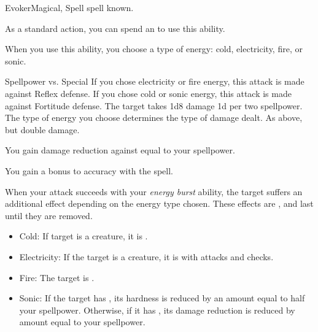     \begin{feat}{Evoker}{Magical, Spell}
        \featpre {} spell known.
        \featben

         As a standard action, you can spend an  to use this ability.
        \begin{ability}
            \begin{spelltargetinginfo}
                \spellspecial When you use this ability, you choose a type of energy: cold, electricity, fire, or sonic.
            \end{spelltargetinginfo}
            \begin{spelleffects}
                \begin{spellattack}{Spellpower vs. Special}
                    \spellspecial If you chose electricity or fire energy, this attack is made against Reflex defense. If you chose cold or sonic energy, this attack is made against Fortitude defense.
                    \spellsuccess The target takes 1d8 damage \plus1d per two spellpower.
                    The type of energy you choose determines the type of damage dealt.
                    \spellcritical As above, but double damage.
                \end{spellattack}
            \end{spelleffects}
        \end{ability}

         You gain damage reduction against  equal to your spellpower.

         You gain a  bonus to accuracy with the  spell.

         When your attack succeeds with your \textit{energy burst} ability, the target suffers an additional effect depending on the energy type chosen.
        These effects are , and last until they are removed.
        \begin{itemize}
            \item Cold: If target is a creature, it is \fatigued.
            \item Electricity: If the target is a creature, it is \impaired with attacks and checks.
            \item Fire: The target is \ignited.
            \item Sonic: If the target has , its hardness is reduced by an amount equal to half your spellpower. Otherwise, if it has , its damage reduction is reduced by amount equal to your spellpower.
        \end{itemize}


\end{feat}
